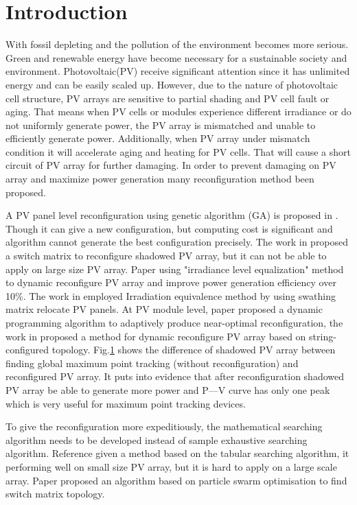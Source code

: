 \documentclass[conference]{IEEEtran}
\begin{document}
\section{Introduction}
With fossil depleting and the pollution of the environment becomes more serious. Green and renewable energy have become necessary for a sustainable society and environment. Photovoltaic(PV) receive significant attention since it has unlimited energy and can be easily scaled up. However, due to the nature of photovoltaic cell structure, PV arrays are sensitive to partial shading and PV cell fault or aging. That means when PV cells or modules experience different irradiance or do not uniformly generate power, the PV array is mismatched and unable to efficiently generate power. Additionally, when PV array under mismatch condition it will accelerate aging and heating for PV cells. That will cause a short circuit of PV array for further damaging. In order to prevent damaging on PV array and maximize power generation many reconfiguration method been proposed.

A PV panel level reconfiguration using genetic algorithm (GA) is proposed in \cite{carotenuto2015evolutionary}. Though it can give a new configuration, but computing cost is significant and algorithm cannot generate the best configuration precisely. The work in \cite{nguyen2008adaptive} proposed a switch matrix to reconfigure shadowed PV array, but it can not be able to apply on large size PV array. Paper \cite{storey2013improved} using "irradiance level equalization" method to dynamic reconfigure PV array and improve power generation efficiency over 10\%. The work in \cite{malathy2017reconfiguration} employed Irradiation equivalence method by using swathing matrix relocate PV panels. At PV module level, paper \cite{wang2014architecture} proposed a dynamic programming algorithm to adaptively produce near-optimal reconfiguration, the work in \cite{storey2014optimized} proposed a method for dynamic reconfigure PV array based on string-configured topology.
Fig.\ref{} shows the difference of shadowed PV array between finding global maximum point tracking (without reconfiguration) and reconfigured PV array.
It puts into evidence that after reconfiguration shadowed PV array be able to generate more power and P—V curve has only one peak which is very useful for maximum point tracking devices.

To give the reconfiguration more expeditiously, the mathematical searching algorithm needs to be developed instead of sample exhaustive searching algorithm. Reference \cite{faldella1991architectural} given a method based on the tabular searching algorithm, it performing well on small size PV array, but it is hard to apply on a large scale array. Paper \cite{iraji2017optimisation} proposed an algorithm based on particle swarm optimisation to find switch matrix topology. 
\end{document}
